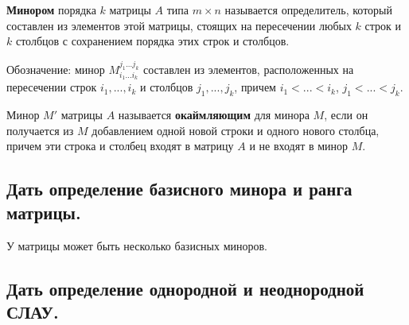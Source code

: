 {\bf{Минором}} порядка $k$ матрицы $A$ типа $m\times n$ называется определитель, который составлен из элементов этой матрицы, стоящих на пересечении любых $k$ строк и $k$ столбцов с сохранением порядка этих строк и столбцов.

Обозначение: минор $M^{j_1 ... j_k}_{i_1 ... i_k}$ составлен из элементов, расположенных на пересечении строк $i_1, ..., i_k$ и столбцов $j_1, ..., j_k$, причем $i_1<...<i_k$, $j_1<...<j_k$.

\vspace*{15pt}

Минор $M'$ матрицы $A$ называется {\bf{окаймляющим}} для минора $M$, если он получается из $M$ добавлением одной новой строки и одного нового столбца, причем эти строка и столбец входят в матрицу $A$ и не входят в минор $M$.

\subsection{Дать определение базисного минора и ранга матрицы.}


\vspace*{15pt}


У матрицы может быть несколько базисных миноров.

\subsection{Дать определение однородной и неоднородной СЛАУ.}


